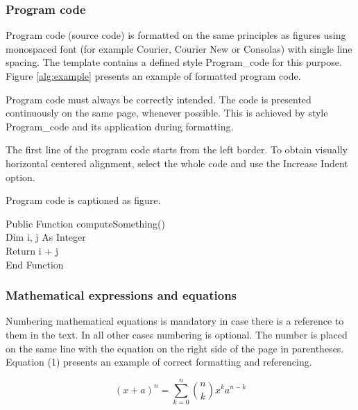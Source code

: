 \subsubsection{Program code}


Program code (source code) is formatted on the same principles as figures using monospaced font (for example Courier, Courier New or Consolas) with single line spacing. The template contains a defined style Program\_code for this purpose. Figure
\ref{alg:example} presents an example of formatted program code.

Program code must always be correctly intended. The code is presented continuously on the same page, whenever possible. This is achieved by style Program\_code and its application during formatting.

The first line of the program code starts from the left border. To obtain visually horizontal centered alignment, select the whole code and use the Increase Indent option.

Program code is captioned as figure.

\begin{algorithm}[!ht]
 Public Function computeSomething() \\
 Dim i, j As Integer\\
Return i + j\\
End Function\\
\label{alg:example}
\end{algorithm}


\subsubsection{Mathematical expressions and equations}

Numbering mathematical equations is mandatory in case there is a reference to them in
the text. In all other cases numbering is optional. The number is placed on the same line
with the equation on the right side of the page in parentheses. Equation (1) presents an
example of correct formatting and referencing.

\begin{equation}
(x+a)^n = \sum_{k=0}^{n} {n \choose k} x^ka^{n-k}
\end{equation}

